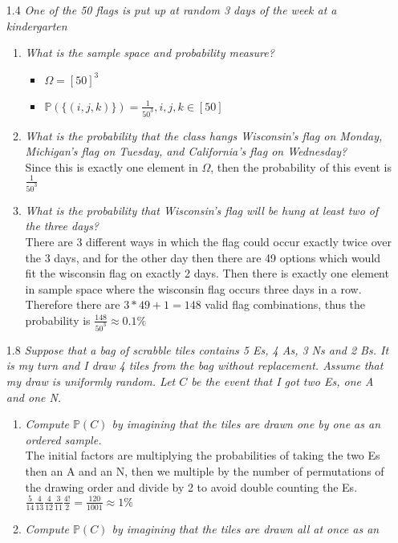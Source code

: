 \documentclass[12pt, letterpaper]{article}
\newcommand{\Pro}{\mathbb{P}}
\begin{document}
\begin{enumerate}
	\item[1.4] \textit{One of the 50 flags is put up at random 3 days of the week at a kindergarten}
	\begin{enumerate}
		\item \textit{What is the sample space and probability measure?}
		\begin{itemize}
			\item $\Omega = [50]^3$
			\item $\Pro(\{(i,j,k)\}) = \frac{1}{50^3}, i,j,k \in [50]$
		\end{itemize}
		\item \textit{What is the probability that the class hangs Wisconsin’s flag on Monday,
Michigan’s flag on Tuesday, and California’s flag on Wednesday?}\\
		Since this is exactly one element in $\Omega$, then the probability of this event is $\frac{1}{50^3}$
		\item \textit{What is the probability that Wisconsin’s flag will be hung at least two of
the three days?}\\
	There are 3 different ways in which the flag could occur exactly twice over the 3 days, and for the other day then there are 49 options which would fit the wisconsin flag on exactly 2 days.  Then there is exactly one element in sample space where the wisconsin flag occurs three days in a row.  Therefore there are 
	$3*49 + 1 = 148$ valid flag combinations, thus the probability is 
	$\frac{148}{50^3} \approx 0.1\%$
	\end{enumerate}
	\item[1.8] \textit{Suppose that a bag of scrabble tiles contains 5 Es, 4 As, 3 Ns and
2 Bs. It is my turn and I draw 4 tiles from the bag without replacement. Assume
that my draw is uniformly random. Let $C$ be the event that I got two Es, one A
and one N.}
	\begin{enumerate}
		\item \textit{Compute $\Pro(C )$ by imagining that the tiles are drawn one by one as an
ordered sample.}\\
	The initial factors are multiplying the probabilities of taking the two Es then an A and an N, then we multiple by the number of permutations of the drawing order and divide by 2 to avoid double counting the Es.  \\
	$\displaystyle  \frac{5}{14}\frac{4}{13}\frac{4}{12}\frac{3}{11} \frac{4!}{2}= \frac{120}{1001} \approx 1\% $
		\item \textit{Compute $\Pro(C )$ by imagining that the tiles are drawn all at once as an
}
\end{enumerate}
\end{enumerate}
\end{document}
